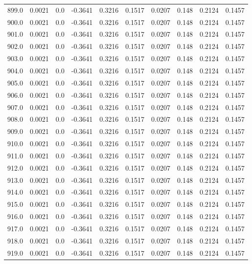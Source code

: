 \begin{longtable}{lrrrrrrrrr}
899.0 & 0.0021 & 0.0 & -0.3641 & 0.3216 & 0.1517 & 0.0207 & 0.148 & 0.2124 & 0.1457 \\
900.0 & 0.0021 & 0.0 & -0.3641 & 0.3216 & 0.1517 & 0.0207 & 0.148 & 0.2124 & 0.1457 \\
901.0 & 0.0021 & 0.0 & -0.3641 & 0.3216 & 0.1517 & 0.0207 & 0.148 & 0.2124 & 0.1457 \\
902.0 & 0.0021 & 0.0 & -0.3641 & 0.3216 & 0.1517 & 0.0207 & 0.148 & 0.2124 & 0.1457 \\
903.0 & 0.0021 & 0.0 & -0.3641 & 0.3216 & 0.1517 & 0.0207 & 0.148 & 0.2124 & 0.1457 \\
904.0 & 0.0021 & 0.0 & -0.3641 & 0.3216 & 0.1517 & 0.0207 & 0.148 & 0.2124 & 0.1457 \\
905.0 & 0.0021 & 0.0 & -0.3641 & 0.3216 & 0.1517 & 0.0207 & 0.148 & 0.2124 & 0.1457 \\
906.0 & 0.0021 & 0.0 & -0.3641 & 0.3216 & 0.1517 & 0.0207 & 0.148 & 0.2124 & 0.1457 \\
907.0 & 0.0021 & 0.0 & -0.3641 & 0.3216 & 0.1517 & 0.0207 & 0.148 & 0.2124 & 0.1457 \\
908.0 & 0.0021 & 0.0 & -0.3641 & 0.3216 & 0.1517 & 0.0207 & 0.148 & 0.2124 & 0.1457 \\
909.0 & 0.0021 & 0.0 & -0.3641 & 0.3216 & 0.1517 & 0.0207 & 0.148 & 0.2124 & 0.1457 \\
910.0 & 0.0021 & 0.0 & -0.3641 & 0.3216 & 0.1517 & 0.0207 & 0.148 & 0.2124 & 0.1457 \\
911.0 & 0.0021 & 0.0 & -0.3641 & 0.3216 & 0.1517 & 0.0207 & 0.148 & 0.2124 & 0.1457 \\
912.0 & 0.0021 & 0.0 & -0.3641 & 0.3216 & 0.1517 & 0.0207 & 0.148 & 0.2124 & 0.1457 \\
913.0 & 0.0021 & 0.0 & -0.3641 & 0.3216 & 0.1517 & 0.0207 & 0.148 & 0.2124 & 0.1457 \\
914.0 & 0.0021 & 0.0 & -0.3641 & 0.3216 & 0.1517 & 0.0207 & 0.148 & 0.2124 & 0.1457 \\
915.0 & 0.0021 & 0.0 & -0.3641 & 0.3216 & 0.1517 & 0.0207 & 0.148 & 0.2124 & 0.1457 \\
916.0 & 0.0021 & 0.0 & -0.3641 & 0.3216 & 0.1517 & 0.0207 & 0.148 & 0.2124 & 0.1457 \\
917.0 & 0.0021 & 0.0 & -0.3641 & 0.3216 & 0.1517 & 0.0207 & 0.148 & 0.2124 & 0.1457 \\
918.0 & 0.0021 & 0.0 & -0.3641 & 0.3216 & 0.1517 & 0.0207 & 0.148 & 0.2124 & 0.1457 \\
919.0 & 0.0021 & 0.0 & -0.3641 & 0.3216 & 0.1517 & 0.0207 & 0.148 & 0.2124 & 0.1457 \\

\end{longtable}
